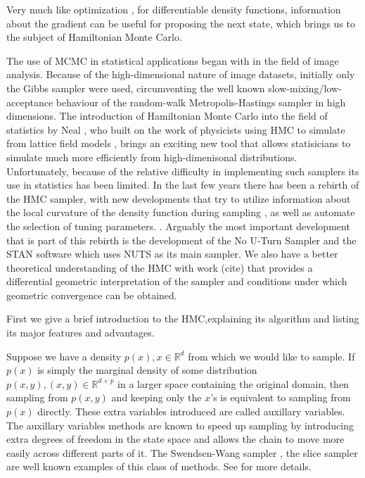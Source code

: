 \documentclass[]{report}
\begin{document}
Very much like optimization \cite{wright1999numerical}, for differentiable density
functions, information about the gradient can be useful for proposing the next
state, which brings us to the subject of Hamiltonian Monte Carlo.


The use of MCMC in statistical applications began with \cite{geman1984stochastic,besag1986statistical} in the field of image analysis. Because of the high-dimensional nature of image datasets, initially only the Gibbs sampler were used, circumventing the well known slow-mixing/low-acceptance behaviour of the random-walk Metropolis-Hastings sampler in high dimensions. The introduction of Hamiltonian Monte Carlo into the field of statistics by Neal \cite{neal2011mcmc,neal2012bayesian}, who built on the work of physicists using HMC to simulate from lattice field models \cite{duane1987hybrid}, brings an exciting new tool that allows statisicians to simulate much more efficiently from high-dimenisonal distributions. Unfortunately, because of the relative difficulty in implementing such samplers its use in statistics has been limited. In the last few years there has been a rebirth of the HMC sampler, with new developments that try to utilize information about the local curvature of the density function during  sampling \cite{girolami2011riemann,betancourt2013general}, as well as  automate the selection of tuning parameters.  \cite{hoffman2014no,betancourt2016identifying}. 
Arguably the most important development that is part of this rebirth is the development of the No U-Turn Sampler and the STAN software which uses NUTS as its main sampler. We  also have a better theoretical understanding of the HMC with work (cite)
that provides a differential geometric interpretation of the sampler and conditions under which geometric convergence can be obtained.

First we give a brief introduction to the HMC,explaining its algorithm and listing its major features and advantages. 

Suppose we have a density $p(x),x \in \mathbb{R}^d$ from which we would like to
sample. If $p(x)$ is simply the marginal density of some distribution $p(x,y),
(x,y) \in \mathbb{R}^{d+p}$ in a larger space containing the original domain, then sampling from $p(x,y)$ and keeping only the $x$'s is equivalent to sampling from $p(x)$ directly. These extra variables introduced are called auxillary variables. The auxillary variables methods are known to speed up sampling by introducing extra degrees of freedom in the state space and allows the chain to move more easily across different parts of it. The Swendsen-Wang sampler \cite{wang1990cluster}, the slice sampler\cite{wang1990cluster} are well known examples of this class of methods. See \cite{liang2011advanced,liu2008monte} for more details.
\end{document}
